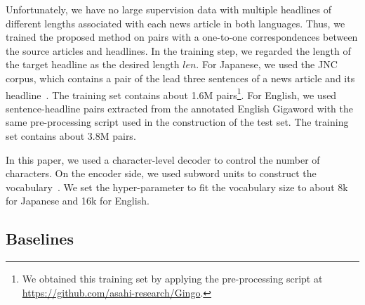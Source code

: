 \documentclass[11pt,a4paper]{article}
\begin{document}
Unfortunately, we have no large supervision data with multiple headlines of different lengths associated with each news article in both languages.
Thus, we trained the proposed method on pairs with a one-to-one correspondences between the source articles and headlines.
In the training step, we regarded the length of the target headline as the desired length $len$.
For Japanese, we used the JNC corpus, which contains a pair of the lead three sentences of a news article and its headline~\cite{Hitomi2019}.
The training set contains about 1.6M pairs\footnote{We obtained this training set by applying the pre-processing script at \href{https://github.com/asahi-research/Gingo}{https://github.com/asahi-research/Gingo}.}.
For English, we used sentence-headline pairs extracted from the annotated English Gigaword with the same pre-processing script used in the construction of the test set.
The training set contains about 3.8M pairs.


In this paper, we used a character-level decoder to control the number of characters.
On the encoder side, we used subword units to construct the vocabulary~\cite{sennrich-haddow-birch:2016:P16-12,P18-1007}.
We set the hyper-parameter to fit the vocabulary size to about 8k for Japanese and 16k for English.




\subsection{Baselines}
\end{document}
